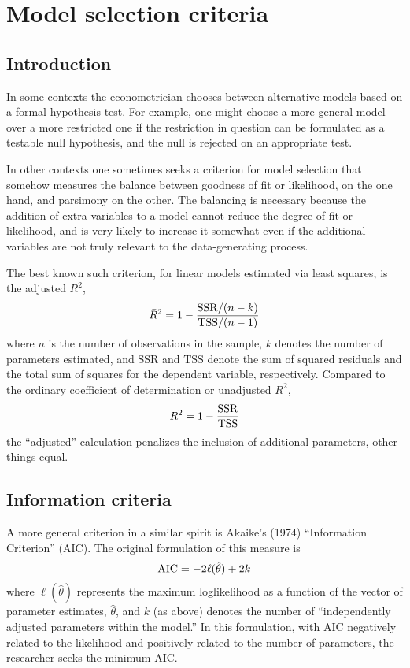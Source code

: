 \chapter{Model selection criteria}
\label{select-criteria}

\section{Introduction}
\label{select-intro}

In some contexts the econometrician chooses between alternative models
based on a formal hypothesis test.  For example, one might choose a
more general model over a more restricted one if the restriction in
question can be formulated as a testable null hypothesis, and the null
is rejected on an appropriate test.

In other contexts one sometimes seeks a criterion for model selection
that somehow measures the balance between goodness of fit or
likelihood, on the one hand, and parsimony on the other.  The
balancing is necessary because the addition of extra variables to a
model cannot reduce the degree of fit or likelihood, and is very
likely to increase it somewhat even if the additional variables are
not truly relevant to the data-generating process.

The best known such criterion, for linear models estimated via least
squares, is the adjusted $R^2$,
%
\[
\bar{R}^2 = 1 - \frac{{\rm SSR} / (n-k)}{{\rm TSS} / (n-1)}
\]
%
where $n$ is the number of observations in the sample, $k$ denotes the
number of parameters estimated, and SSR and TSS denote the sum of
squared residuals and the total sum of squares for the dependent
variable, respectively.  Compared to the ordinary coefficient of
determination or unadjusted $R^2$,
%
\[
R^2 = 1 - \frac{{\rm SSR}}{{\rm TSS}}
\]
%
the ``adjusted'' calculation penalizes the inclusion of additional
parameters, other things equal.  

\section{Information criteria}
\label{select-aic}

A more general criterion in a similar spirit is Akaike's (1974)
``Information Criterion'' (AIC).  The original formulation of this
measure is
%
\begin{equation}
\label{aic-orig}
{\rm AIC} = -2 \ell(\hat{\theta}) + 2k
\end{equation}
%
where $\ell(\hat{\theta})$ represents the maximum loglikelihood as a
function of the vector of parameter estimates, $\hat{\theta}$, and $k$
(as above) denotes the number of ``independently adjusted parameters
within the model.''  In this formulation, with AIC negatively related
to the likelihood and positively related to the number of parameters,
the researcher seeks the minimum AIC.

